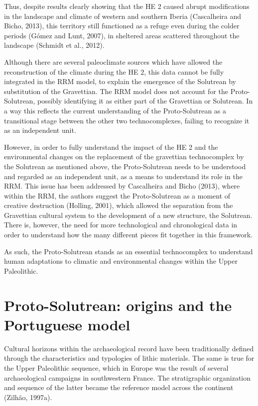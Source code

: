 \documentclass[12pt,twoside]{reedthesis}
\begin{document}
Thus, despite results clearly showing that the HE 2 caused abrupt modifications in the landscape and climate of western and southern Iberia (Cascalheira and Bicho, 2013), this territory still functioned as a refuge even during the colder periods (Gómez and Lunt, 2007), in sheltered areas scattered throughout the landscape (Schmidt et al., 2012).

Although there are several paleoclimate sources which have allowed the reconstruction of the climate during the HE 2, this data cannot be fully integrated in the RRM model, to explain the emergence of the Solutrean by substitution of the Gravettian. The RRM model does not account for the Proto-Solutrean, possibly identifying it as either part of the Gravettian or Solutrean. In a way this reflects the current understanding of the Proto-Solutrean as a transitional stage between the other two technocomplexes, failing to recognize it as an independent unit.

However, in order to fully understand the impact of the HE 2 and the environmental changes on the replacement of the gravettian technocomplex by the Solutrean as mentioned above, the Proto-Solutrean needs to be understood and regarded as an independent unit, as a means to understand its role in the RRM. This issue has been addressed by Cascalheira and Bicho (2013), where within the RRM, the authors suggest the Proto-Solutrean as a moment of creative destruction (Holling, 2001), which allowed the separation from the Gravettian cultural system to the development of a new structure, the Solutrean. There is, however, the need for more technological and chronological data in order to understand how the many different pieces fit together in this framework.

As such, the Proto-Solutrean stands as an essential technocomplex to understand human adaptations to climatic and environmental changes within the Upper Paleolithic.

\hypertarget{proto-solutrean-origins-and-the-portuguese-model}{%
\section{Proto-Solutrean: origins and the Portuguese model}\label{proto-solutrean-origins-and-the-portuguese-model}}

Cultural horizons within the archaeological record have been traditionally defined through the characteristics and typologies of lithic materials. The same is true for the Upper Paleolithic sequence, which in Europe was the result of several archaeological campaigns in southwestern France. The stratigraphic organization and sequence of the latter became the reference model across the continent (Zilhão, 1997a).
\end{document}
